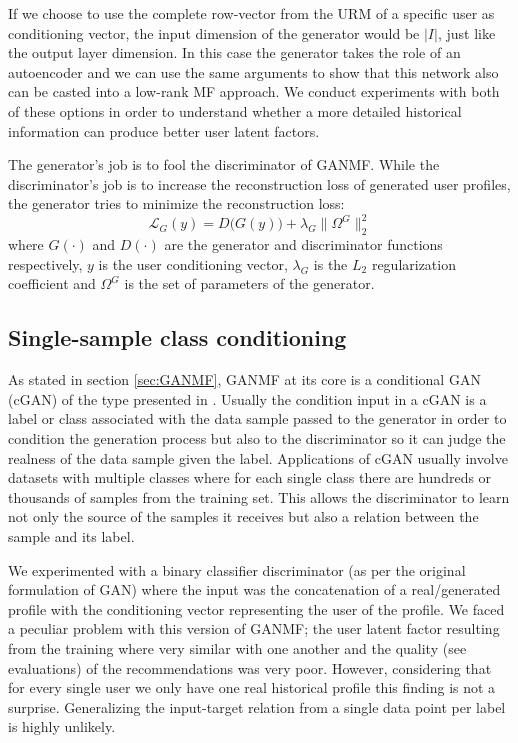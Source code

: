 If we choose to use the complete row-vector from the URM of a specific user as conditioning vector, the input dimension of the generator would be $|I|$, just like the output layer dimension. In this case the generator takes the role of an autoencoder and we can use the same arguments to show that this network also can be casted into a low-rank MF approach. We conduct experiments with both of these options in order to understand whether a more detailed historical information can produce better user latent factors.

The generator's job is to fool the discriminator of GANMF. While the discriminator's job is to increase the reconstruction loss of generated user profiles, the generator tries to minimize the reconstruction loss:
\begin{equation}
    \mathcal{L}_{G}(y) = D\big(G(y)\big) + \lambda_{G} \|\Omega^{G}\|^{2}_{2}
\end{equation}
where $G(\cdot)$ and $D(\cdot)$ are the generator and discriminator functions respectively, $y$ is the user conditioning vector, $\lambda_{G}$ is the \emph{$L_{2}$} regularization coefficient and $\Omega^{G}$ is the set of parameters of the generator.

\subsection{Single-sample class conditioning}
\label{sec:ss_class_conditioning}

As stated in section \ref{sec:GANMF}, GANMF at its core is a conditional GAN (cGAN) of the type presented in \cite{mirza2014conditional}. Usually the condition input in a cGAN is a label or class associated with the data sample passed to the generator in order to condition the generation process but also to the discriminator so it can judge the realness of the data sample given the label. Applications of cGAN usually involve datasets with multiple classes where for each single class there are hundreds or thousands of samples from the training set. This allows the discriminator to learn not only the source of the samples it receives but also a relation between the sample and its label.

We experimented with a binary classifier discriminator (as per the original formulation of GAN) where the input was the concatenation of a real/generated profile with the conditioning vector representing the user of the profile. We faced a peculiar problem with this version of GANMF; the user latent factor resulting from the training where very similar with one another and the quality (see evaluations) of the recommendations was very poor. However, considering that for every single user we only have one real historical profile this finding is not a surprise. Generalizing the input-target relation from a single data point per label is highly unlikely.

